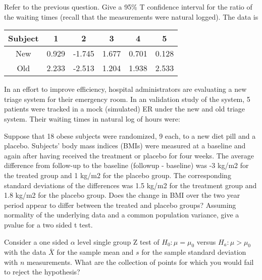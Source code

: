 \documentclass{homework}
\begin{document}
\begin{tcolorbox}[title=Question 5]
Refer to the previous question. Give a 95\% T confidence interval for the ratio of the waiting times (recall that the measurements were natural logged). The data is 

\begin{center}
\begin{tabular}{ |c|c|c|c|c|c| } 
\hline
 Subject & 1 & 2 & 3 & 4 & 5 \\ [0.5ex]
 \hline
 New & 0.929 & -1.745 & 1.677 & 0.701 & 0.128 \\ 
 Old & 2.233 & -2.513 & 1.204 & 1.938 & 2.533 \\
 \hline
\end{tabular}
\end{center}

In an effort to improve efficiency, hospital administrators are evaluating a new triage system for their emergency room. In an validation study of the system, 5 patients were tracked in a mock (simulated) ER under the new and old triage system. Their waiting times in natural log of hours were:
\end{tcolorbox}

\begin{tcolorbox}[title=Question 6]
Suppose that 18 obese subjects were randomized, 9 each, to a new diet pill and a placebo. Subjects’ body mass indices (BMIs) were measured at a baseline and again after having received the treatment or placebo for four weeks. The average difference from follow-up to the baseline (followup - baseline) was -3 kg/m2 for the treated group and 1 kg/m2 for the placebo group. The corresponding standard deviations of the differences was 1.5 kg/m2 for the treatment group and 1.8 kg/m2 for the placebo group. Does the change in BMI over the two year period appear to differ between the treated and placebo groups?  Assuming normality of the underlying data and a common population variance, give a pvalue for a two sided t test.
\end{tcolorbox}

\begin{tcolorbox}[title=Question 7]
Consider a one sided $\alpha$ level single group Z test of $H_0 : \mu = \mu_0$ versus $H_a : \mu > \mu_0$   with the data $\bar X$ for the sample mean and $s$ for the sample standard deviation with $n$ measurements. What are the collection of points for which you would fail to reject the hypothesis?
\end{tcolorbox}
\end{document}
